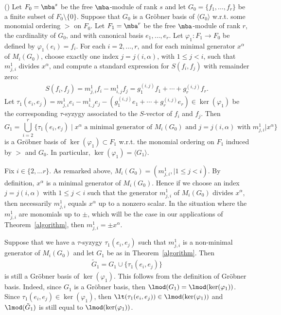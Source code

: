 \begin{theorem}\label{algorithm} {\rm (\cite[Proposition~3.5]{emss})}
Let $F_0=\mba^s$ be the free $\mba$-module of rank $s$ and let
$G_0=\{f_1,\ldots ,f_r\}$ be a finite subset of
$F_0\setminus\{0\}$. Suppose that $G_0$ is a Gr\"obner basis of
$\langle G_0\rangle$ w.r.t. some monomial ordering $>$ on $F_0$. Let
$F_1=\mba^r$ be the free $\mba$-module of rank $r$, the cardinality of
$G_0$, and with canonical basis $e_1,\ldots ,e_r$. Let
$\varphi_1:F_1\rightarrow F_0$ be defined by $\varphi_1(e_i)=f_i$. For
each $i=2,\ldots ,r$, and for each minimal generator $x^{\alpha}$ of
$M_i(G_0)$, choose exactly one index $j=j(i,\alpha)$, with $1\leq
j<i$, such that $m^1_{j,i}$ divides $x^\alpha$, and compute a standard
expression for $S(f_i,f_j)$ with remainder zero:
\begin{eqnarray*}
S(f_i,f_j)=m^1_{j,i}f_i-m^1_{i,j}f_j=g_1^{(i,j)}f_1+\cdots
+g_r^{(i,j)}f_r.
\end{eqnarray*}
Let $\tau_1(e_i,e_j)=m^1_{j,i}e_i-m^1_{i,j}e_j-(g_1^{(i,j)}e_1+\cdots
+g_r^{(i,j)}e_r)\in \ker(\varphi_1)$ be the corresponding
$\tau$-syzygy associated to the $S$-vector of $f_i$ and $f_j$. Then
\begin{equation*}
G_1=\bigcup_{i=2}^{r}\{\tau_1(e_i,e_j)\!\mid\!x^\alpha\text{ a minimal generator of }M_i(G_0)\text{ and }j=j(i,\alpha)\text{ with }
m^1_{j,i}\vert x^\alpha\}
\end{equation*}
is a Gr\"obner basis of $\ker(\varphi_1)\subset F_1$ w.r.t. the
monomial ordering on $F_1$ induced by $>$ and $G_0$. In particular,
$\ker(\varphi_1)=\langle G_1\rangle$.
\end{theorem}

\begin{remark}\label{uptosign} 
Fix $i\in \{2,\ldots r\}$. As remarked above,
$M_i(G_0)=(m^1_{j,i},\mid 1\leq j<i)$. By definition, $x^{\alpha}$ is
a minimal generator of $M_i(G_0)$. Hence if we choose an index
$j=j(i,\alpha)$ with $1\leq j<i$ such that the generator $m^1_{j,i}$
of $M_i(G_0)$ divides $x^{\alpha}$, then necessarily $m^1_{j,i}$
equals $x^\alpha$ up to a nonzero scalar. In the situation where the
$m^1_{j,i}$ are monomials up to $\pm$, which will be the case in our
applications of Theorem~\ref{algorithm}, then $m^1_{j,i}=\pm
x^\alpha$.
\end{remark}

\begin{remark}\label{nonminimal}
Suppose that we have a $\tau$-syzygy $\tau_1(e_i,e_j)$ such that
$m^1_{j,i}$ is a non-minimal generator of $M_i(G_0)$ and let $G_1$ be
as in Theorem~\ref{algorithm}. Then 
\begin{eqnarray*}
\tilde{G}_1=G_1\cup \{\tau_1(e_i,e_j)\}
\end{eqnarray*}
is still a Gr\"obner basis of
$\ker(\varphi_1)$. This follows from the definition of Gr\"obner
basis. Indeed, since $G_1$ is a Gr\"obner basis, then
$\lmod(G_1)=\lmod(\ker(\varphi_1))$. Since
$\tau_1(e_i,e_j)\in\ker(\varphi_1)$, then
$\lt(\tau_1(e_i,e_j))\in\lmod(\ker(\varphi_1))$ and
$\lmod(\tilde{G}_1)$ is still equal to $\lmod(\ker(\varphi_1))$.
\end{remark}

